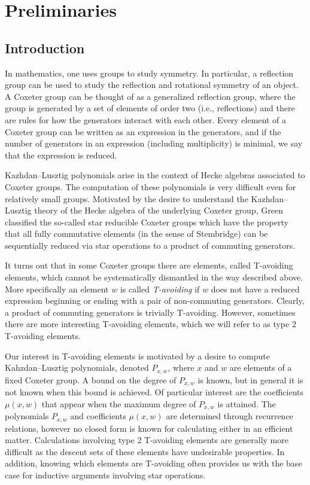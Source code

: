 \chapter{Preliminaries}

\section{Introduction}
In mathematics, one uses groups to study symmetry.  In particular, a reflection group can be used to study the reflection and rotational symmetry of an object.  A Coxeter group can be thought of as a generalized reflection group, where the group is generated by a set of elements of order two (i.e., reflections) and there are rules for how the generators interact with each other.  Every element of a Coxeter group can be written as an expression in the generators, and if the number of generators in an expression (including multiplicity) is minimal, we say that the expression is reduced. 

Kazhdan--Lusztig polynomials arise in the context of Hecke algebras associated to Coxeter groups. The computation of these polynomials is very difficult even for relatively small groups. Motivated by the desire to understand the Kazhdan--Lusztig theory of the Hecke algebra of the underlying Coxeter group, Green~\cite{Green2006a} classified the so-called star reducible Coxeter groups which have the property that all fully commutative elements (in the sense of Stembridge) can be sequentially reduced via star operations to a product of commuting generators. 

It turns out that in some Coxeter groups there are elements, called T-avoiding elements, which cannot be systematically dismantled in the way described above. More specifically an element $w$ is called \emph{T-avoiding} if $w$ does not have a reduced expression beginning or ending with a pair of non-commuting generators. Clearly, a product of commuting generators is trivially T-avoiding. However, sometimes there are more interesting T-avoiding elements, which we will refer to as type 2 T-avoiding elements. 

Our interest in T-avoiding elements is motivated by a desire to compute Kahzdan--Lusztig polynomials, denoted $P_{x,w}$, where $x$ and $w$ are elements of a fixed Coxeter group. A bound on the degree of $P_{x,w}$ is known, but in general it is not known when this bound is achieved. Of particular interest are the coefficients $\mu(x,w)$ that appear when the maximum degree of $P_{x,w}$ is attained. The polynomials $P_{x,w}$ and coefficients $\mu(x,w)$ are determined through recurrence relations, however no closed form is known for calculating either in an efficient matter. Calculations involving type 2 T-avoiding elements are generally more difficult as the descent sets of these elements have undesirable properties.   In addition, knowing which elements are T-avoiding often provides us with the base case for inductive arguments involving star operations.

